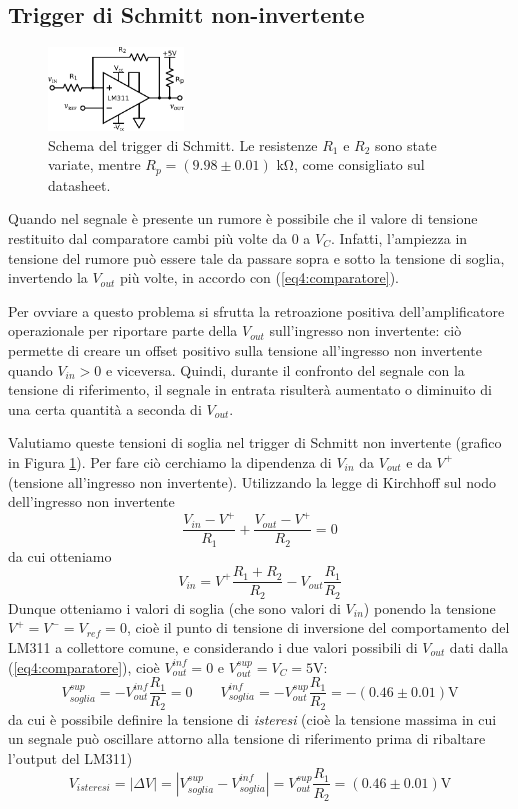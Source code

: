 \subsection{Trigger di Schmitt non-invertente}

\begin{figure}
  \begin{center}
    \includegraphics[width=0.320\textwidth]{../E04/latex/c_schmitt.pdf}
  \end{center}
  \caption{Schema del trigger di Schmitt. Le resistenze $R_1$ e $R_2$ sono state variate, mentre $R_p=(9.98 \pm 0.01)$ \si{\kilo\ohm}, come consigliato sul datasheet.}
  \label{cir4:schmitt}
\end{figure}

Quando nel segnale è presente un rumore è possibile che il valore di tensione restituito dal comparatore cambi più volte da $0$ a $V_{C}$.
Infatti, l'ampiezza in tensione del rumore può essere tale da passare sopra e sotto la tensione di soglia, invertendo la $V_{out}$ più volte, in accordo con (\ref{eq4:comparatore}).

Per ovviare a questo problema si sfrutta la retroazione positiva dell'amplificatore operazionale per riportare parte della $V_{out}$ sull'ingresso non invertente: ciò permette di creare un offset positivo sulla tensione all'ingresso non invertente quando $V_{in}>0$ e viceversa.
Quindi, durante il confronto del segnale con la tensione di riferimento, il segnale in entrata risulterà aumentato o diminuito di una certa quantità a seconda di $V_{out}$.

Valutiamo queste tensioni di soglia nel trigger di Schmitt non invertente (grafico in Figura \ref{cir4:schmitt}).
Per fare ciò cerchiamo la dipendenza di $V_{in}$ da $V_{out}$ e da $V^+$ (tensione all'ingresso non invertente). Utilizzando la legge di Kirchhoff sul nodo dell'ingresso non invertente
$$\frac{V_{in}-V^+}{R_1} + \frac{V_{out}-V^+}{R_2} = 0$$
da cui otteniamo
\begin{equation}
V_{in} = V^+ \frac{R_1+R_2}{R_2} - V_{out} \frac{R_1}{R_2}
\label{eq4:v_in_parte2}
\end{equation}
Dunque otteniamo i valori di soglia (che sono valori di $V_{in}$) ponendo la tensione $V^+=V^-=V_{ref}=0$, cioè il punto di tensione di inversione del comportamento del LM311 a collettore comune, e considerando i due valori possibili di $V_{out}$ dati dalla (\ref{eq4:comparatore}), cioè $V_{out}^{inf}=0$ e $V_{out}^{sup}=V_{C}=5$\si{\volt}:
$$V_{soglia}^{sup} = - V_{out}^{inf} \frac{R_1}{R_2} = 0 \qquad V_{soglia}^{inf} = - V_{out}^{sup} \frac{R_1}{R_2} = - (0.46 \pm 0.01) \si{\volt}$$
da cui è possibile definire la tensione di \textit{isteresi} (cioè la tensione massima in cui un segnale può oscillare attorno alla tensione di riferimento prima di ribaltare l'output del LM311)
$$V_{isteresi} = |\Delta V| = |V_{soglia}^{sup} - V_{soglia}^{inf}| = V_{out}^{sup} \frac{R_1}{R_2} = (0.46 \pm 0.01) \si{\volt}$$

